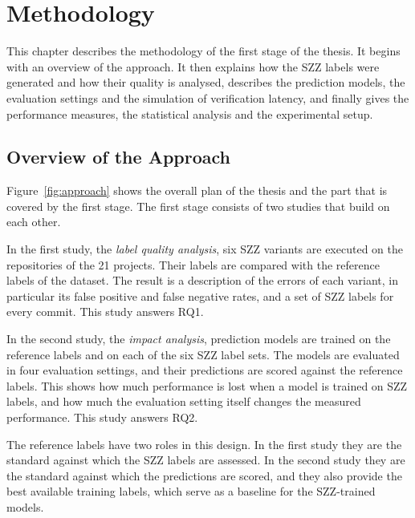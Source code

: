 \documentclass[12pt,a4paper,oneside]{report}
\begin{document}
\chapter{Methodology}\label{ch:method}

This chapter describes the methodology of the first stage of the thesis. It
begins with an overview of the approach. It then explains how the SZZ labels
were generated and how their quality is analysed, describes the prediction
models, the evaluation settings and the simulation of verification latency,
and finally gives the performance measures, the statistical analysis and the
experimental setup.

\section{Overview of the Approach}

Figure~\ref{fig:approach} shows the overall plan of the thesis and the part
that is covered by the first stage. The first stage consists of two studies
that build on each other.

In the first study, the \emph{label quality analysis}, six SZZ variants are
executed on the repositories of the 21 projects. Their labels are compared
with the reference labels of the dataset. The result is a description of the
errors of each variant, in particular its false positive and false negative
rates, and a set of SZZ labels for every commit. This study answers RQ1.

In the second study, the \emph{impact analysis}, prediction models are
trained on the reference labels and on each of the six SZZ label sets. The
models are evaluated in four evaluation settings, and their predictions are
scored against the reference labels. This shows how much performance is lost
when a model is trained on SZZ labels, and how much the evaluation setting
itself changes the measured performance. This study answers RQ2.

The reference labels have two roles in this design. In the first study they
are the standard against which the SZZ labels are assessed. In the second
study they are the standard against which the predictions are scored, and
they also provide the best available training labels, which serve as a
baseline for the SZZ-trained models.
\end{document}
